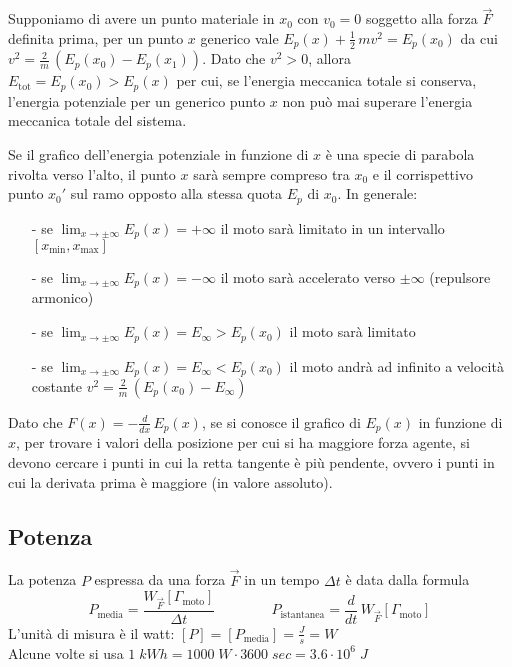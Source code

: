 \documentclass[a4paper]{article}
\newcommand\dt{\frac{d}{dt}\,}
\begin{document}
Supponiamo di avere un punto materiale in \(x_0\) con \(v_0 = 0\) soggetto alla forza \(\vec{F}\) definita prima, per un punto
\(x\) generico vale \(E_p(x) + \frac{1}{2} \, mv^2 = E_p(x_0)\) da cui \(v^2 = \frac{2}{m} \, (E_p(x_0)-E_p(x_1))\).
Dato che \(v^2 > 0\), allora \(E_\text{tot} = E_p(x_0) > E_p(x)\) per cui, se l'energia meccanica totale si conserva, l'energia
potenziale per un generico punto \(x\) non può mai superare l'energia meccanica totale del sistema.

Se il grafico dell'energia potenziale in funzione di \(x\) è una specie di parabola rivolta verso l'alto, il punto \(x\) sarà
sempre compreso tra \(x_0\) e il corrispettivo punto \(x_0'\) sul ramo opposto alla stessa quota \(E_p\) di \(x_0\).
In generale:
\begin{itemize}[topsep=3pt, itemsep=0pt]
	\item[-] se \(\displaystyle \lim_{x \to \pm \infty} E_p(x) = + \infty\) il moto sarà limitato in un intervallo \([x_\text{min}, x_\text{max}]\)
	\item[-] se \(\displaystyle \lim_{x \to \pm \infty} E_p(x) = - \infty\) il moto sarà accelerato verso \(\pm \infty\) (repulsore armonico)
	\item[-] se \(\displaystyle \lim_{x \to \pm \infty} E_p(x) = E_\infty > E_p(x_0)\) il moto sarà limitato
	\item[-] se \(\displaystyle \lim_{x \to \pm \infty} E_p(x) = E_\infty < E_p(x_0)\) il moto andrà ad infinito a velocità costante \(v^2 = \frac{2}{m} \, (E_p(x_0) - E_\infty)\)
\end{itemize}

Dato che \(F(x) = -\frac{d}{dx} \, E_p(x)\), se si conosce il grafico di \(E_p(x)\) in funzione di \(x\), per trovare i valori
della posizione per cui si ha maggiore forza agente, si devono cercare i punti in cui la retta tangente è più pendente, ovvero
i punti in cui la derivata prima è maggiore (in valore assoluto). 

\subsection{Potenza}
La potenza \(P\) espressa da una forza \(\vec{F}\) in un tempo \(\Delta t\) è data dalla formula
\[P_\text{media} = \frac{W_{\vec{F}}[\Gamma_\text{moto}]}{\Delta t} \qquad \qquad P_\text{istantanea} = \dt W_{\vec{F}}[\Gamma_\text{moto}]\]
L'unità di misura è il watt: \(\displaystyle [P] = [P_\text{media}] = \frac{J}{s} = W\) \\
Alcune volte si usa \(1 \; kWh = 1000 \; W \cdot 3600 \; sec = 3.6 \cdot 10^6 \; J\)
\end{document}
